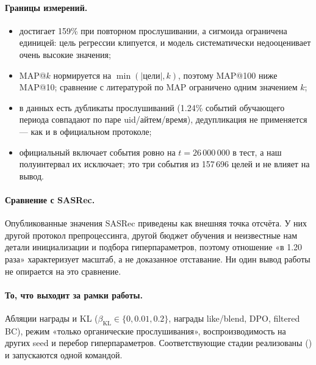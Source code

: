 \paragraph{Границы измерений.}
\begin{itemize}[leftmargin=1.2em,itemsep=1pt,topsep=2pt]
  \item {} достигает 159\% при повторном
        прослушивании, а сигмоида ограничена единицей: цель регрессии
        клипуется, и модель систематически недооценивает очень высокие
        значения;
  \item MAP@$k$ нормируется на $\min(|\text{цели}|,k)$, поэтому MAP@100
        ниже MAP@10; сравнение с литературой по MAP ограничено
        одним значением $k$;
  \item в данных есть дубликаты прослушиваний (1.24\% событий обучающего
        периода совпадают по паре uid/айтем/время), дедупликация не
        применяется --- как и в официальном протоколе;
  \item официальный  включает события ровно на
        $t=26\,000\,000$ в тест, а наш полуинтервал их исключает; это
        три события из 157\,696 целей и не влияет на вывод.
\end{itemize}

\paragraph{Сравнение с SASRec.} Опубликованные значения SASRec приведены
как внешняя точка отсчёта. У них другой протокол препроцессинга, другой
бюджет обучения и неизвестные нам детали инициализации и подбора
гиперпараметров, поэтому отношение «в 1.20 раза» характеризует масштаб, а не
доказанное отставание. Ни один вывод работы не опирается на это сравнение.

\paragraph{То, что выходит за рамки работы.} Абляции награды и KL
($\beta_{\text{KL}} \in \{0, 0.01, 0.2\}$, награды like/blend, DPO,
filtered BC), режим «только органические прослушивания», воспроизводимость
на других seed и перебор гиперпараметров. Соответствующие стадии
реализованы () и запускаются одной командой.

